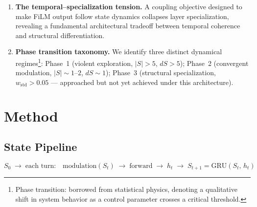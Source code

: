 \documentclass[11pt,a4paper]{article}
\newcommand{\St}{S_t}
\newcommand{\Stp}{S_{t+1}}
\begin{document}
\begin{enumerate}[leftmargin=*, label=\textbf{\arabic*.}]
  \item \textbf{The temporal--specialization tension.}
    A coupling objective designed to make FiLM output follow state dynamics collapses
    layer specialization, revealing a fundamental architectural tradeoff between
    temporal coherence and structural differentiation.

  \item \textbf{Phase transition taxonomy.}
    We identify three distinct dynamical regimes\footnote{Phase transition: borrowed from statistical physics, denoting a qualitative shift in system behavior as a control parameter crosses a critical threshold.}: Phase~1 (violent exploration,
    $|S|>5$, $dS>5$); Phase~2 (convergent modulation, $|S|\sim 1$--$2$,
    $dS\sim 1$); Phase~3 (structural specialization, $w_{\mathrm{std}}>0.05$ ---
    approached but not yet achieved under this architecture).

\end{enumerate}

\section{Method}

\subsection{State Pipeline}

\[
  S_0 \;\to\; \text{each turn:}\quad \mathrm{modulation}(\St) \;\to\; \mathrm{forward} \;\to\; h_t \;\to\; \Stp = \mathrm{GRU}(\St,\, h_t)
\]
\end{document}
